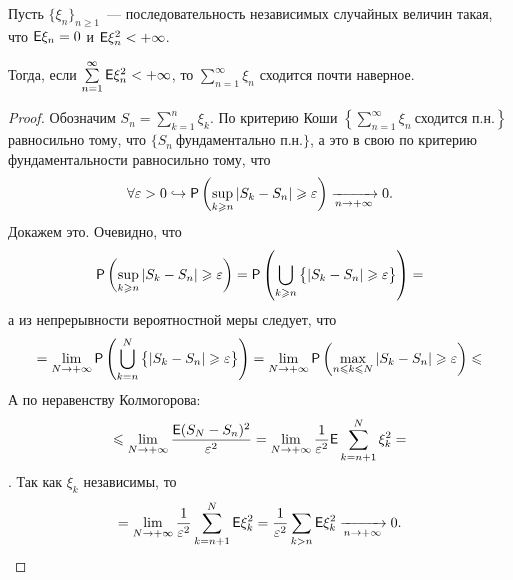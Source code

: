 \begin{theorem}
	Пусть $\{\xi_n \}_{n \geqslant 1}$~--- последовательность независимых случайных величин такая, что $\E \xi_n = 0 $ и $\E \xi_n^2 < +\infty$. 
	
	Тогда, если $\sum\limits_{n = 1}^{\infty} \E \xi_n^2 < +\infty$, то $ \sum\limits_{n = 1}^{\infty} \xi_n$ сходится почти наверное.
	\begin{proof}
		Обозначим $S_n = \sum\limits_{k=1}^n \xi_k$. По критерию Коши $\left\{ \sum\limits_{n = 1}^{\infty}\xi_n~\text{сходится п.н.} \right\}$ равносильно тому, что $\{ S_n~\text{фундаментально п.н.}\}$, а это в свою по критерию фундаментальности равносильно тому, что 
		$$\forall \varepsilon > 0 \hookrightarrow \P \left( \sup\limits_{k \geqslant n} | S_k - S_n | \geqslant \varepsilon \right) \limn 0.$$ Докажем это.
		 Очевидно, что
		 $$\P \left( \sup\limits_{k \geqslant n} | S_k - S_n | \geqslant \varepsilon \right) = \P \left( \bigcup\limits_{k \geqslant n} \big\{| S_k - S_n | \geqslant \varepsilon \big\} \right) =$$
		 а из непрерывности вероятностной меры следует, что 
		 $$= \lim\limits_{N \rightarrow +\infty} \P \left( \bigcup\limits_{k = n}^{N} \big\{| S_k - S_n | \geqslant \varepsilon \big\} \right) = \lim\limits_{N \rightarrow +\infty} \P \left( \max\limits_{n \leqslant k \leqslant N} | S_k - S_n | \geqslant \varepsilon \right) \leqslant$$
		 А по неравенству Колмогорова:
		 $$\leqslant \lim\limits_{N \rightarrow + \infty} \dfrac{\E ( S_N - S_n)^2}{\varepsilon^2} = \lim\limits_{N \rightarrow + \infty} \dfrac{1}{\varepsilon^2} \E \sum\limits_{k = n + 1}^N \xi_k^2 = $$.
		 Так как $\xi_k$ независимы, то
		 $$= \lim\limits_{N \rightarrow + \infty} \dfrac{1}{\varepsilon^2} \sum\limits_{k = n + 1}^N \E \xi_k^2 = \dfrac{1}{\varepsilon^2} \sum\limits_{k > n} \E \xi_k^2 \limn 0.$$
	\end{proof}
\end{theorem}


